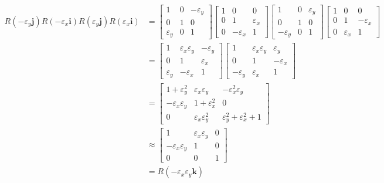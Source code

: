 \documentclass[../principles-of-quantum-mechanics.tex]{subfiles}
\begin{document}
\begin{questions}
\begin{solution}
\begin{align*}
			R(-\varepsilon_y\mathbf{j})R(-\varepsilon_x\mathbf{i})R(\varepsilon_y\mathbf{j})R(\varepsilon_x\mathbf{i}) &= \begin{bmatrix}1 & 0 & -\varepsilon_y \\ 0 & 1 & 0 \\ \varepsilon_y & 0 & 1\end{bmatrix}\begin{bmatrix}1 & 0 & 0 \\ 0 & 1 & \varepsilon_x \\ 0 & -\varepsilon_x & 1\end{bmatrix}\begin{bmatrix}1 & 0 & \varepsilon_y \\ 0 & 1 & 0 \\ -\varepsilon_y & 0 & 1\end{bmatrix}\begin{bmatrix}1 & 0 & 0 \\ 0 & 1 & -\varepsilon_x \\ 0 & \varepsilon_x & 1\end{bmatrix} \\
			&= \begin{bmatrix}1 & \varepsilon_x\varepsilon_y & -\varepsilon_y \\ 0 & 1 & \varepsilon_x \\ \varepsilon_y & -\varepsilon_x & 1\end{bmatrix}\begin{bmatrix}1 & \varepsilon_x\varepsilon_y & \varepsilon_y \\ 0 & 1 & -\varepsilon_x \\ -\varepsilon_y & \varepsilon_x & 1\end{bmatrix} \\
			&= \begin{bmatrix}
				1 + \varepsilon_y^2 & \varepsilon_x\varepsilon_y & -\varepsilon_x^2\varepsilon_y \\ -\varepsilon_x\varepsilon_y & 1 + \varepsilon_x^2 & 0 \\ 0 & \varepsilon_x\varepsilon_y^2 & \varepsilon_y^2 + \varepsilon_x^2 + 1
			\end{bmatrix} \\
			&\approx \begin{bmatrix}
				1 & \varepsilon_x\varepsilon_y & 0 \\ -\varepsilon_x\varepsilon_y & 1 & 0 \\ 0 & 0 & 1
			\end{bmatrix} \\
			&= R(-\varepsilon_x\varepsilon_y\mathbf{k})

\end{align*}
\end{solution}
\end{questions}
\end{document}
